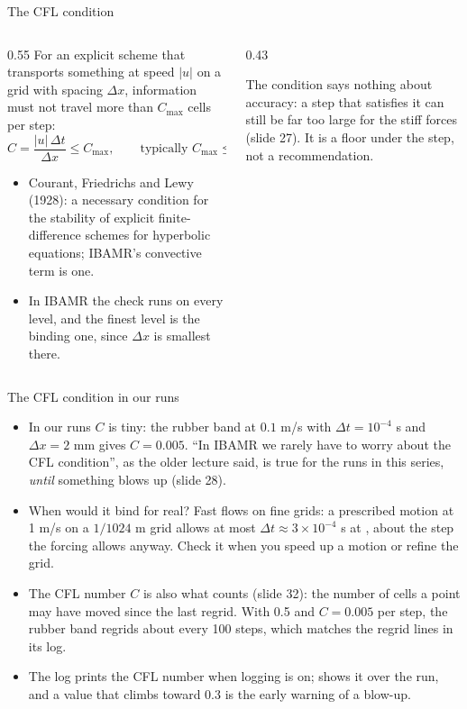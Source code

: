 \documentclass[aspectratio=169,11pt]{beamer}
\begin{document}
\begin{frame}{The CFL condition}
\begin{columns}[T,onlytextwidth]
\begin{column}{0.55\textwidth}
For an explicit scheme that transports something at speed $|u|$ on a grid with spacing $\Delta x$, information must not travel more than $C_{\max}$ cells per step:
\[
C = \frac{|u|\,\Delta t}{\Delta x} \le C_{\max}, \qquad\text{typically } C_{\max} \le 1 .
\]
\begin{itemize}
  \item Courant, Friedrichs and Lewy (1928): a necessary condition for the stability of explicit finite-difference schemes for hyperbolic equations; IBAMR's convective term is one.
  \item In IBAMR the check runs on every level, and the finest level is the binding one, since $\Delta x$ is smallest there.
\end{itemize}
\end{column}
\begin{column}{0.43\textwidth}
\begin{punchbox}
\small The condition says nothing about accuracy: a step that satisfies it can still be far too large for the stiff forces (slide 27). It is a floor under the step, not a recommendation.
\end{punchbox}
\end{column}
\end{columns}
\end{frame}

\begin{frame}{The CFL condition in our runs}
\begin{itemize}
  \item In our runs $C$ is tiny: the rubber band at $0.1$ m/s with $\Delta t = 10^{-4}$ s and $\Delta x = 2$ mm gives $C = 0.005$. ``In IBAMR we rarely have to worry about the CFL condition'', as the older lecture said, is true for the runs in this series, \emph{until} something blows up (slide 28).
  \item When would it bind for real? Fast flows on fine grids: a prescribed motion at 1 m/s on a $1/1024$ m grid allows at most $\Delta t \approx 3\times10^{-4}$ s at , about the step the forcing allows anyway. Check it when you speed up a motion or refine the grid.
  \item The CFL number $C$ is also what  counts (slide 32): the number of cells a point may have moved since the last regrid. With 0.5 and $C = 0.005$ per step, the rubber band regrids about every 100 steps, which matches the regrid lines in its log.
  \item The log prints the CFL number when logging is on;  shows it over the run, and a value that climbs toward 0.3 is the early warning of a blow-up.
\end{itemize}
\end{frame}
\end{document}
